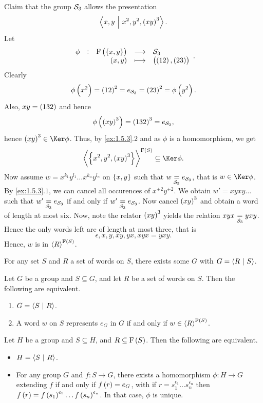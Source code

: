 \begin{example}
Claim that the group $ \mathcal{S}_3 $ allows the presentation
$$ \abr{x, y \st x^2, y^2, \br{xy}^3}. $$
Let
$$ \function[\phi]{\F\br{\cbr{x, y}}}{\SSS_3}{\br{x, y}}{\br{\br{12}, \br{23}}}. $$
Clearly
$$ \phi\br{x^2} = \br{12}^2 = e_{\SSS_3} = \br{23}^2 = \phi\br{y^2}. $$
Also, $ xy = \br{132} $ and hence
$$ \phi\br{\br{xy}^3} = \br{132}^3 = e_{\SSS_3}, $$
hence $ \br{xy}^3 \in \Ker \phi $. Thus, by \ref{ex:1.5.3}.$ 2 $ and as $ \phi $ is a homomorphism, we get
$$ \abr{\cbr{x^2, y^2, \br{xy}^3}}^{\F\br{S}} \subseteq \Ker \phi. $$
Now assume $ w = x^{k_1}y^{l_1} \dots x^{k_n}y^{l_n} $ on $ \cbr{x, y} $ such that $ w \underset{\mathcal{S}_3}{=} e_{\mathcal{S}_3} $, that is $ w \in \Ker \phi $. By \ref{ex:1.5.3}.$ 1 $, we can cancel all occurences of $ x^{\pm 2}y^{\pm 2} $. We obtain $ w' = xyxy \dots $ such that $ w' \underset{\mathcal{S}_3}{=} e_{\mathcal{S}_3} $ if and only if $ w' \underset{\mathcal{S}_3}{=} e_{\mathcal{S}_3} $. Now cancel $ \br{xy}^3 $ and obtain a word of length at most six. Now, note the relator $ \br{xy}^3 $ yields the relation $ xyx \underset{\mathcal{S}_3}{=} yxy $. Hence the only words left are of length at most three, that is
$$ \epsilon, x, y, xy, yx, xyx = yxy. $$
Hence, $ w $ is in $ \abr{R}^{\F\br{S}} $.
\end{example}

\begin{exercise}
For any set $ S $ and $ R $ a set of words on $ S $, there exists some $ G $ with $ G = \left\langle R \ \middle| \  S \right\rangle $.
\end{exercise}

\pagebreak

\begin{remark}
\label{rem:1.5.7}
Let $ G $ be a group and $ S \subseteq G $, and let $ R $ be a set of words on $ S $. Then the following are equivalent.
\begin{enumerate}
\item $ G = \left\langle S \ \middle| \  R \right\rangle $.
\item A word $ w $ on $ S $ represents $ e_G $ in $ G $ if and only if $ w \in \abr{R}^{\F\br{S}} $.
\end{enumerate}
\end{remark}

\begin{proposition}
Let $ H $ be a group and $ S \subseteq H $, and $ R \subseteq \F\br{S} $. Then the following are equivalent.
\begin{itemize}
\item $ H = \left\langle S \ \middle| \  R \right\rangle $.
\item For any group $ G $ and $ f : S \to G $, there exists a homomorphism $ \phi : H \to G $ extending $ f $ if and only if $ f\br{r} = e_G $, with if $ r = s_1^{\epsilon_1} \dots s_n^{\epsilon_n} $ then $ f\br{r} = f\br{s_1}^{\epsilon_1} \dots f\br{s_n}^{\epsilon_n} $. In that case, $ \phi $ is unique.
\end{itemize}
\end{proposition}

